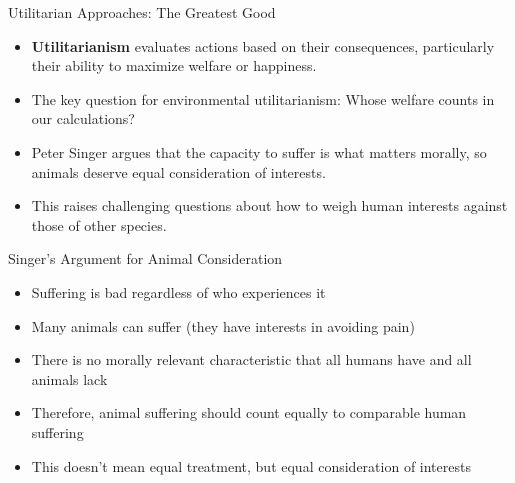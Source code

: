 \documentclass{beamer}
\begin{document}
	\begin{frame}{Utilitarian Approaches: The Greatest Good}
		\begin{itemize}
			\item \textbf{Utilitarianism} evaluates actions based on their consequences, particularly their ability to maximize welfare or happiness.
			\item The key question for environmental utilitarianism: Whose welfare counts in our calculations?
			\item Peter Singer argues that the capacity to suffer is what matters morally, so animals deserve equal consideration of interests.
			\item This raises challenging questions about how to weigh human interests against those of other species.
		\end{itemize}
		
		\begin{block}{Singer's Argument for Animal Consideration}
			\scriptsize
			\begin{itemize}
				\item Suffering is bad regardless of who experiences it
				\item Many animals can suffer (they have interests in avoiding pain)
				\item There is no morally relevant characteristic that all humans have and all animals lack
				\item Therefore, animal suffering should count equally to comparable human suffering
				\item This doesn't mean equal treatment, but equal consideration of interests
			\end{itemize}
		\end{block}
	\end{frame}
	
\end{document}

